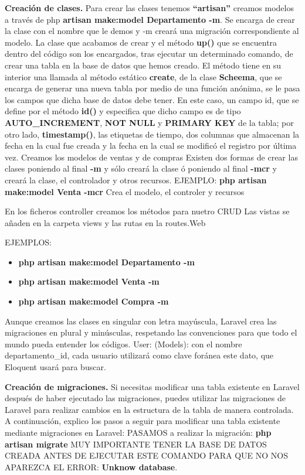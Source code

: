 \documentclass{article}
\begin{document}
\textbf{Creación de clases.}
Para crear las clases tenemos \textbf{“artisan”} creamos modelos a través de php \textbf{artisan make:model Departamento -m}. Se encarga de crear la clase con el nombre que le demos y -m creará una migración correspondiente al modelo.
La clase que acabamos de crear y el método \textbf{up()} que se encuentra dentro del código son los encargados, tras ejecutar un determinado comando, de crear una tabla en la base de datos que hemos creado.
El método tiene en su interior una llamada al método estático \textbf{create}, de la clase \textbf{Scheema}, que se encarga de generar una nueva tabla por medio de una función anónima, se le pasa los campos que dicha base de datos debe tener. En este caso, un campo id, que se define por el método \textbf{id()} y especifica que dicho campo es de tipo \textbf{AUTO\_INCREMENT}, \textbf{NOT NULL} y \textbf{PRIMARY KEY} de la tabla; por otro lado, \textbf{timestamp()}, las etiquetas de tiempo,  dos columnas que almacenan la fecha en la cual fue creada y la fecha en la cual se modificó el registro por última vez.
Creamos los modelos de ventas y de compras  
Existen dos formas de crear las clases poniendo al final \textbf{-m} y sólo creará la clase ó poniendo al final \textbf{-mcr} y creará la clase, el controlador y otros recursos.
EJEMPLO: \textbf{php artisan make:model Venta -mcr}
Crea el modelo, el controler y recursos

En los ficheros controller creamos los métodos para nuetro CRUD
Las vistas se añaden en la carpeta views y las rutas en la routes.Web
	
EJEMPLOS: 
\begin{itemize}
    \item \textbf{php artisan make:model Departamento -m}
    \item \textbf{php artisan make:model Venta -m}
    \item \textbf{php artisan make:model Compra -m}
\end{itemize}


Aunque creamos las clases en singular con letra mayúscula, Laravel crea las migraciones en plural y minúsculas, respetando las convenciones para que todo el mundo pueda entender los códigos.
User: (Models): con el nombre departamento\_id, cada usuario utilizará como clave foránea este dato, que Eloquent usará para buscar.

\textbf{Creación de migraciones.}
Si necesitas modificar una tabla existente en Laravel después de haber ejecutado las migraciones, puedes utilizar las migraciones de Laravel para realizar cambios en la estructura de la tabla de manera controlada.
A continuación, explico los pasos a seguir para modificar una tabla existente mediante migraciones en Laravel:
PASAMOS a realizar la migración: \textbf{php artisan migrate} 
MUY IMPORTANTE TENER LA BASE DE DATOS CREADA ANTES DE EJECUTAR ESTE COMANDO PARA QUE NO NOS APAREZCA EL ERROR: \textbf{Unknow database}.
\end{document}
